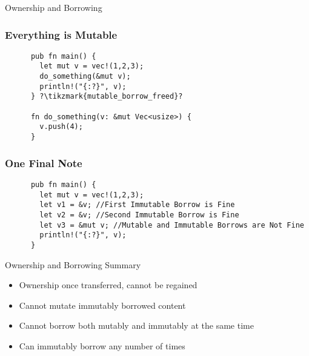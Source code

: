 \begin{section}{Ownership and Borrowing}
  \begin{frame}[fragile]
    \frametitle{Everything is Mutable}
    \begin{verbatim}
      pub fn main() {
        let mut v = vec!(1,2,3);
        do_something(&mut v);
        println!("{:?}", v);
      } ?\tikzmark{mutable_borrow_freed}?

      fn do_something(v: &mut Vec<usize>) {
        v.push(4);
      }
    \end{verbatim}
  \end{frame}

  \begin{frame}[fragile]
    \frametitle{One Final Note \cite{RustLangCh4}}
    \begin{verbatim}
      pub fn main() {
        let mut v = vec!(1,2,3);
        let v1 = &v; //First Immutable Borrow is Fine
        let v2 = &v; //Second Immutable Borrow is Fine
        let v3 = &mut v; //Mutable and Immutable Borrows are Not Fine
        println!("{:?}", v);
      }
    \end{verbatim}
  \end{frame}

  \begin{frame}{Ownership and Borrowing Summary}
    \begin{itemize}
    \item Ownership once transferred, cannot be regained
    \item Cannot mutate immutably borrowed content
    \item Cannot borrow both mutably and immutably at the same time
    \item Can immutably borrow any number of times
    \end{itemize}
  \end{frame}

\end{section}
